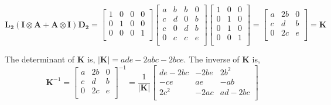 \documentclass{article}
\begin{document}
\begin{equation}
\mathbf{L_2}(\mathbf{I} \otimes \mathbf{A} + \mathbf{A} \otimes \mathbf{I}) \mathbf{D_2}=
\begin{bmatrix}
1 &0 &0 &0 \\
0 &1 &0  &0\\
0 &0 &0 &1\\
\end{bmatrix}
\begin{bmatrix}
a &b &b &0 \\
c &d &0 &b \\
c &0 &d &b\\
0 &c &c &e \\
\end{bmatrix}
\begin{bmatrix}
1 &0 &0 \\
0 &1 &0 \\
0 &1 &0\\
0 &0 &1 \\
\end{bmatrix}=
\begin{bmatrix}
a &2b &0 \\
c &d &b \\
0 &2c &e\\
\end{bmatrix}=\mathbf{K}
\end{equation}

The determinant of $\mathbf{K}$ is, $|\mathbf{K}|=ade-2abc-2bce$. The inverse of $\mathbf{K}$ is,
\begin{equation}
\mathbf{K}^{-1}=
{\begin{bmatrix}
a &2b &0 \\
c &d &b \\
0 &2c &e\\
\end{bmatrix}}^{-1}=\frac{1}{|\mathbf{K}|}
{
\begin{bmatrix}
de-2bc &-2be &2b^2 \\
-ce &ae &-ab \\
2c^2 &-2ac &ad-2bc\\
\end{bmatrix}
}
\end{equation}
\end{document}
